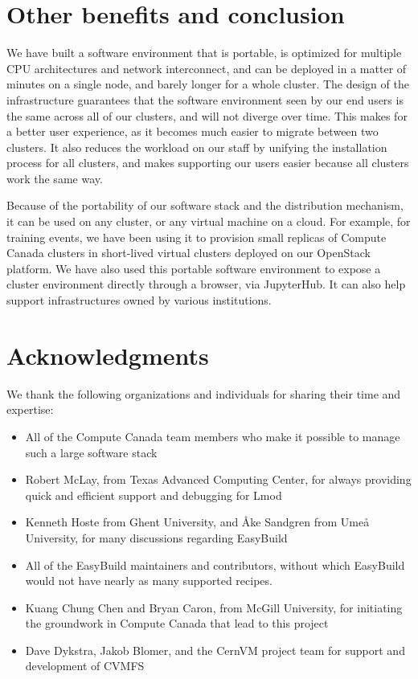 \documentclass[sigconf]{acmart}
\begin{document}
\section{Other benefits and conclusion}
\label{sec:Conclusion}
We have built a software environment that is portable, is optimized for multiple CPU architectures and network interconnect, and can be deployed in a matter of minutes on a single node, and barely longer for a whole cluster. The design of the infrastructure guarantees that the software environment seen by our end users is the same across all of our clusters, and will not diverge over time. This makes for a better user experience, as it becomes much easier to migrate between two clusters. It also reduces the workload on our staff by unifying the installation process for all clusters, and makes supporting our users easier because all clusters work the same way.

Because of the portability of our software stack and the distribution mechanism, it can be used on any cluster, or any virtual machine on a cloud. For example, for training events, we have been using it to provision small replicas of Compute Canada clusters in short-lived virtual clusters deployed on our OpenStack platform. We have also used this portable software environment to expose a cluster environment directly through a browser, via JupyterHub. It can also help support infrastructures owned by various institutions.



\section{Acknowledgments}
\label{sec:Acknowledgments}
We thank the following organizations and individuals for sharing their time and expertise:
\begin{itemize}
	\item All of the Compute Canada team members who make it possible to manage such a large software stack
	\item Robert McLay, from Texas Advanced Computing Center, for always providing quick and efficient support and
debugging for Lmod
	\item Kenneth Hoste from Ghent University, and Åke Sandgren from Umeå University, for many discussions
regarding EasyBuild
    \item All of the EasyBuild maintainers and contributors, without which EasyBuild would not have nearly as many supported recipes.
	\item Kuang Chung Chen and Bryan Caron, from McGill University, for initiating the groundwork in Compute Canada that lead to this project
	\item Dave Dykstra, Jakob Blomer, and the CernVM project team for support and development of CVMFS
\end{itemize}

%


\end{document}

